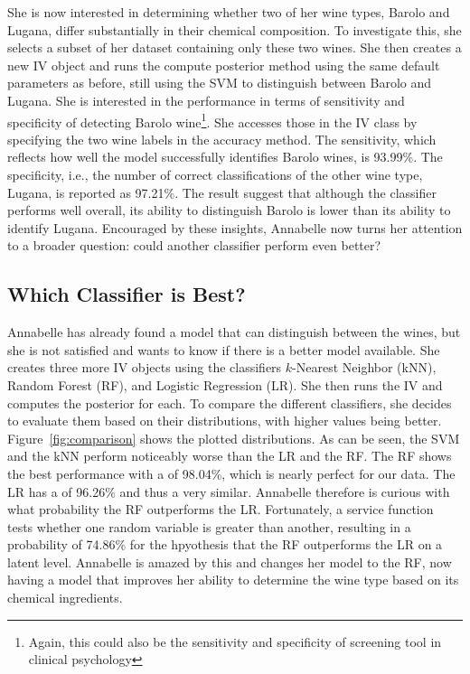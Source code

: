 \documentclass[article]{jss}
\begin{document}
She is now interested in determining whether two of her wine types, Barolo and Lugana, differ substantially in their chemical composition.
To investigate this, she selects a subset of her dataset containing only these two wines.
She then creates a new IV object and runs the compute posterior method using the same default parameters as before, still using the SVM to distinguish between Barolo and Lugana.
She is interested in the performance in terms of sensitivity and specificity of detecting Barolo wine\footnote{Again, this could also be the sensitivity and specificity of screening tool in clinical psychology}.
She accesses those in the IV class by specifying the two wine labels in the accuracy method.
The sensitivity, which reflects how well the model successfully identifies Barolo wines, is 93.99\%. The specificity, i.e., the number of correct classifications of the other wine type, Lugana, is reported as 97.21\%.
The result suggest that although the classifier performs well overall, its ability to distinguish Barolo is lower than its ability to identify Lugana.
Encouraged by these insights, Annabelle now turns her attention to a broader question: could another classifier perform even better?

\subsection{Which Classifier is Best?} \label{sec:ex_classifier_best}

Annabelle has already found a model that can distinguish between the wines, but she is not satisfied and wants to know if there is a better model available.
She creates three more IV objects using the classifiers $k$-Nearest Neighbor (kNN), Random Forest (RF), and Logistic Regression (LR).
She then runs the IV and computes the posterior for each.
To compare the different classifiers, she decides to evaluate them based on their  distributions, with higher values being better.
Figure~\ref{fig:comparison} shows the plotted distributions.
As can be seen, the SVM and the kNN perform noticeably worse than the LR and the RF.
The RF shows the best performance with a  of 98.04\%, which is nearly perfect for our data.
The LR has a  of 96.26\% and thus a very similar. Annabelle therefore is curious with what probability the RF outperforms the LR.
Fortunately, a service function tests whether one random variable is greater than another, resulting in a probability of 74.86\% for the hpyothesis that the RF outperforms the LR on a latent level.
Annabelle is amazed by this and changes her model to the RF, now having a model that improves her ability to determine the wine type based on its chemical ingredients.
\end{document}
